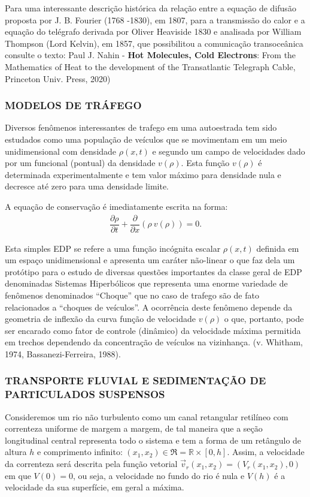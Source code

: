Para uma interessante descrição histórica da relação entre a equação de difusão proposta por J. B. Fourier (1768 -1830), em 1807, para a transmissão do calor e a equação do telégrafo derivada por Oliver Heaviside 1830 e analisada por William Thompson (Lord Kelvin), em 1857, que possibilitou a comunicação transoceânica consulte o texto: Paul J. Nahin - \textbf{Hot Molecules, Cold Electrons}: From the Mathematics of Heat to the development of the Transatlantic Telegraph Cable, Princeton Univ. Press, 2020)

\subsubsection{MODELOS DE TRÁFEGO}

Diversos fenômenos interessantes de trafego em uma autoestrada tem sido estudados como uma população de veículos que se movimentam em um meio unidimensional com densidade \(\rho(x,t)\) e segundo um campo de velocidades dado por um funcional (pontual) da densidade \(v(\rho)\). Esta função \(v(\rho)\) é determinada experimentalmente e tem valor máximo para densidade nula e decresce até zero para uma densidade limite.

A equação de conservação é imediatamente escrita na forma:
\begin{eqnarray}
\dfrac{\partial \rho}{\partial t} + \dfrac{\partial }{\partial x} (\rho\ v(\rho)) = 0.
\end{eqnarray}

Esta simples EDP se refere a uma função incógnita escalar \(\rho(x,t)\) definida em um espaço unidimensional e apresenta um caráter não-linear o que faz dela um protótipo para o estudo de diversas questões importantes da classe geral de EDP denominadas Sistemas Hiperbólicos que representa uma enorme variedade de fenômenos denominados ``Choque'' que no caso de trafego são de fato relacionados a ``choques de veículos''. A ocorrência deste fenômeno depende da geometria de inflexão da curva função de velocidade \(v(\rho)\) o que, portanto, pode ser encarado como fator de controle (dinâmico) da velocidade máxima permitida em trechos dependendo da concentração de veículos na vizinhança. (v. Whitham, 1974, Bassanezi-Ferreira, 1988).

\subsubsection{TRANSPORTE FLUVIAL E SEDIMENTAÇÃO DE PARTICULADOS SUSPENSOS}

Consideremos um rio não turbulento como um canal retangular retilíneo com correnteza uniforme de margem a margem, de tal maneira que a seção longitudinal central representa todo o sistema e tem a forma de um retângulo de altura \(h\) e comprimento infinito: \((x_1, x_2) \in \mathfrak{R} = \mathbb{R} \times [0, h]\). Assim, a velocidade da correnteza será descrita pela função vetorial \(\vec{v}_r(x_1, x_2) = (V_r(x_1, x_2), 0)\) em que \(V(0) = 0\), ou seja, a velocidade no fundo do rio é nula e \(V(h)\) é a velocidade da sua superfície, em geral a máxima.

